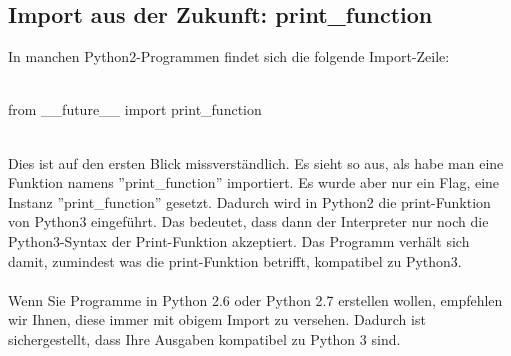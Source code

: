 \subsection{Import aus der Zukunft: print\_function}
In manchen Python2-Programmen findet sich die folgende Import-Zeile: \\
\\
\begin{MyConsoleBox}{
from \_\_future\_\_ import print\_function
}\end{MyConsoleBox}
\\
Dies ist auf den ersten Blick missverständlich. Es sieht so aus, als habe man eine Funktion namens ''print\_function'' importiert. Es wurde aber nur ein Flag, eine Instanz ''print\_function'' gesetzt. Dadurch wird in Python2 die print-Funktion von Python3 eingeführt. Das bedeutet, dass dann der Interpreter nur noch die Python3-Syntax der Print-Funktion akzeptiert. Das Programm verhält sich damit, zumindest was die print-Funktion betrifft, kompatibel zu Python3.\\
\\
Wenn Sie Programme in Python 2.6 oder Python 2.7 erstellen wollen, empfehlen wir Ihnen, diese immer mit obigem Import zu versehen. Dadurch ist sichergestellt, dass Ihre Ausgaben kompatibel zu Python 3 sind. \\
\\